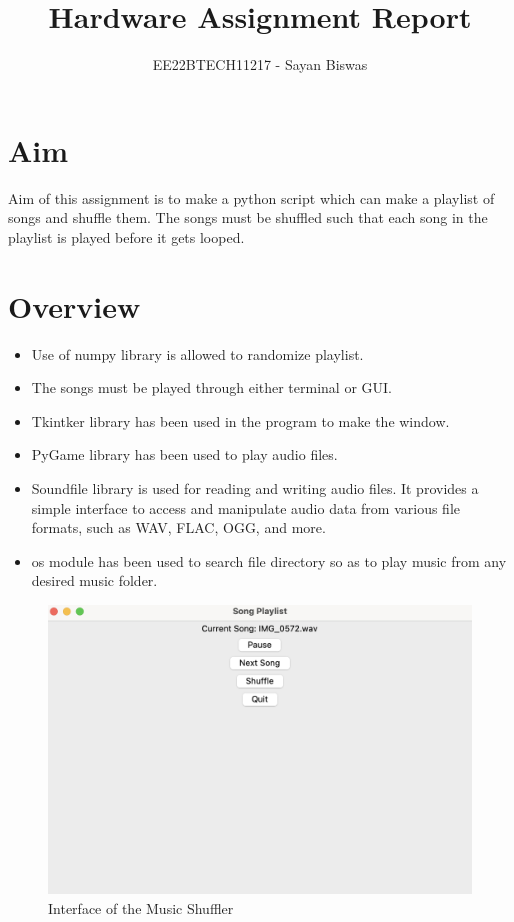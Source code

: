 \documentclass{article}
\begin{document}
\title{Hardware Assignment Report}
\author{EE22BTECH11217 -  Sayan Biswas}
\date{}
\maketitle
\maketitle
\section{Aim}
Aim of this assignment is to make a python script which can make a playlist of songs and shuffle them. The songs must be shuffled such that each song in the playlist is played before it gets looped.
\section{Overview}
\begin{itemize}
\item Use of numpy library is allowed to randomize playlist.
\item The songs must be played through either terminal or GUI.
\item Tkintker library has been used in the program to make the window.
\item PyGame library has been used to play audio files.
\item Soundfile library is used for reading and writing audio files. It provides a simple interface to access and manipulate audio data from various file formats, such as WAV, FLAC, OGG, and more.
\item os module has been used to search file directory so as to play music from any desired music folder.
\end{itemize}
\begin{figure}[ht]
\centering
\includegraphics[width=0.7\linewidth]{images/Pygameinterface.png}
\caption{Interface of the Music Shuffler}
\end{figure}
\FloatBarrier
\end{document}
